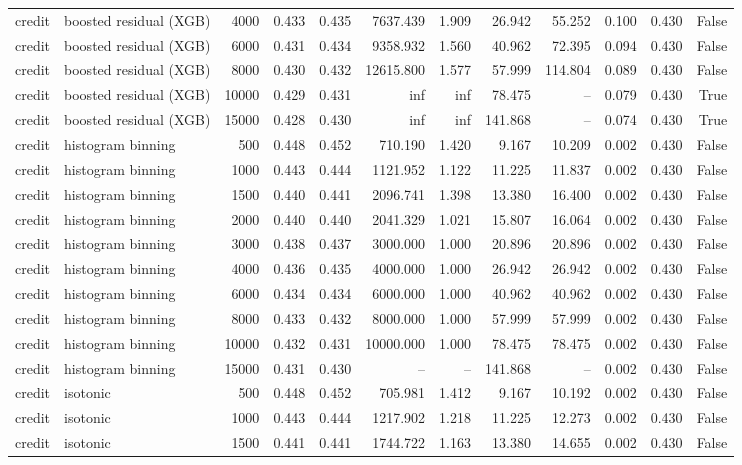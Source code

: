 \begin{tabular}{llrrrrrrrrrr}
credit & boosted residual (XGB) & 4000 & 0.433 & 0.435 & 7637.439 & 1.909 & 26.942 & 55.252 & 0.100 & 0.430 & False \\
credit & boosted residual (XGB) & 6000 & 0.431 & 0.434 & 9358.932 & 1.560 & 40.962 & 72.395 & 0.094 & 0.430 & False \\
credit & boosted residual (XGB) & 8000 & 0.430 & 0.432 & 12615.800 & 1.577 & 57.999 & 114.804 & 0.089 & 0.430 & False \\
credit & boosted residual (XGB) & 10000 & 0.429 & 0.431 & inf & inf & 78.475 & -- & 0.079 & 0.430 & True \\
credit & boosted residual (XGB) & 15000 & 0.428 & 0.430 & inf & inf & 141.868 & -- & 0.074 & 0.430 & True \\
credit & histogram binning & 500 & 0.448 & 0.452 & 710.190 & 1.420 & 9.167 & 10.209 & 0.002 & 0.430 & False \\
credit & histogram binning & 1000 & 0.443 & 0.444 & 1121.952 & 1.122 & 11.225 & 11.837 & 0.002 & 0.430 & False \\
credit & histogram binning & 1500 & 0.440 & 0.441 & 2096.741 & 1.398 & 13.380 & 16.400 & 0.002 & 0.430 & False \\
credit & histogram binning & 2000 & 0.440 & 0.440 & 2041.329 & 1.021 & 15.807 & 16.064 & 0.002 & 0.430 & False \\
credit & histogram binning & 3000 & 0.438 & 0.437 & 3000.000 & 1.000 & 20.896 & 20.896 & 0.002 & 0.430 & False \\
credit & histogram binning & 4000 & 0.436 & 0.435 & 4000.000 & 1.000 & 26.942 & 26.942 & 0.002 & 0.430 & False \\
credit & histogram binning & 6000 & 0.434 & 0.434 & 6000.000 & 1.000 & 40.962 & 40.962 & 0.002 & 0.430 & False \\
credit & histogram binning & 8000 & 0.433 & 0.432 & 8000.000 & 1.000 & 57.999 & 57.999 & 0.002 & 0.430 & False \\
credit & histogram binning & 10000 & 0.432 & 0.431 & 10000.000 & 1.000 & 78.475 & 78.475 & 0.002 & 0.430 & False \\
credit & histogram binning & 15000 & 0.431 & 0.430 & -- & -- & 141.868 & -- & 0.002 & 0.430 & False \\
credit & isotonic & 500 & 0.448 & 0.452 & 705.981 & 1.412 & 9.167 & 10.192 & 0.002 & 0.430 & False \\
credit & isotonic & 1000 & 0.443 & 0.444 & 1217.902 & 1.218 & 11.225 & 12.273 & 0.002 & 0.430 & False \\
credit & isotonic & 1500 & 0.441 & 0.441 & 1744.722 & 1.163 & 13.380 & 14.655 & 0.002 & 0.430 & False \\

\end{tabular}
